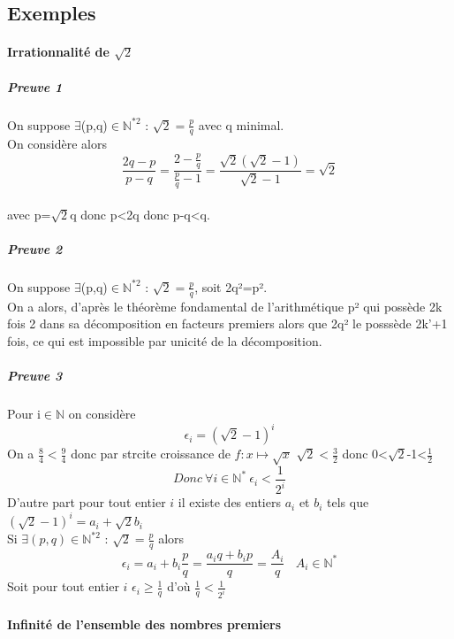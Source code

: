     \subsection{Exemples}

        \paragraph{Irrationnalité de $\sqrt{2}$}

        \subparagraph{Preuve 1}

            On suppose $\exists$(p,q)$\in\mathbb{N} ^{*2}$ : $\sqrt{2} =\frac{p}{q}$ avec q minimal.
            \\On considère alors \[\frac{2q-p}{p-q} =\frac{2-\frac{p}{q}}{\frac{p}{q} -1} =\frac{\sqrt{2} (\sqrt{2} -1)}{\sqrt{2} -1} =\sqrt{2}\]
            \\avec p=$\sqrt{2}$q donc p<2q donc p-q<q.

        \subparagraph{Preuve 2}

            On suppose $\exists$(p,q)$\in\mathbb{N} ^{*2}$ : $\sqrt{2} =\frac{p}{q}$, soit 2q²=p².
            \\On a alors, d'après le théorème fondamental de l'arithmétique p² qui possède 2k fois 2 dans sa décomposition en facteurs premiers alors que 2q² le posssède 2k'+1 fois, ce qui est impossible par unicité de la décomposition.

        \subparagraph{Preuve 3}

            Pour i$\in\mathbb{N}$ on considère \[\epsilon _i=(\sqrt{2} -1)^i\]
            On a $\frac{8}{4} <\frac{9}{4}$ donc par strcite croissance de $f:x\mapsto\sqrt{x}$ $\sqrt{2} <\frac{3}{2}$ donc 0<$\sqrt{2}$-1<$\frac{1}{2}$
            \[Donc~\forall i\in\mathbb{N} ^*~\epsilon _i<\frac{1}{2^i}\]
            D'autre part pour tout entier $i$ il existe des entiers $a_i$ et $b_i$ tels que 
            \\$(\sqrt{2} -1)^i=a_i+\sqrt{2} b_i$
            \\Si $\exists (p,q)\in\mathbb{N} ^{*2}$ : $\sqrt{2} =\frac{p}{q}$ alors \[\epsilon _i=a_i+b_i\frac{p}{q} =\frac{a_iq+b_ip}{q} =\frac{A_i}{q} ~~~~A_i\in\mathbb{N} ^*\]
            Soit pour tout entier $i$ $\epsilon _i\geq\frac{1}{q}$ d'où $\frac{1}{q} <\frac{1}{2^i}$

        \paragraph{Infinité de l'ensemble des nombres premiers}

